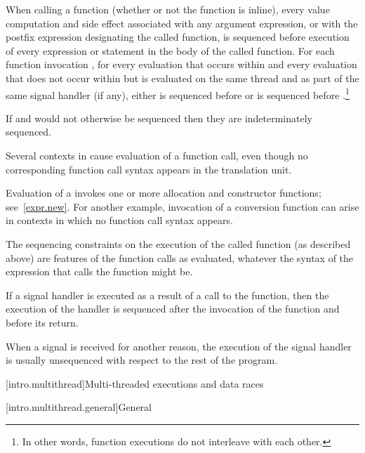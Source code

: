 \pnum
When calling a function (whether or not the function is inline), every
%
value computation and
%
side effect associated with any argument
expression, or with the postfix expression designating the called
function, is sequenced before execution of every expression or statement
in the body of the called function.
For each function invocation ,
for every evaluation  that occurs within  and
every evaluation  that does not occur within  but
is evaluated on the same thread and as part of the same signal handler (if any),
either  is sequenced before  or
 is sequenced before .\footnote{In other words,
function executions do not interleave with each other.}
\begin{note}
If  and  would not otherwise be sequenced then they are
indeterminately sequenced.
\end{note}
Several contexts in \Cpp{} cause evaluation of a function call, even
though no corresponding function call syntax appears in the translation
unit.
\begin{example}
Evaluation of a  invokes one or more allocation
and constructor functions; see~\ref{expr.new}. For another example,
invocation of a conversion function can arise in
contexts in which no function call syntax appears.
\end{example}
The sequencing constraints on the execution of the called function (as
described above) are features of the function calls as evaluated,
whatever the syntax of the expression that calls the function might be.%
%

%
%
\pnum
If a signal handler is executed as a result of a call to the 
function, then the execution of the handler is sequenced after the invocation
of the  function and before its return.
\begin{note}
When a signal is received for another reason, the execution of the
signal handler is usually unsequenced with respect to the rest of the program.
\end{note}

[intro.multithread]{Multi-threaded executions and data races}

[intro.multithread.general]{General}


